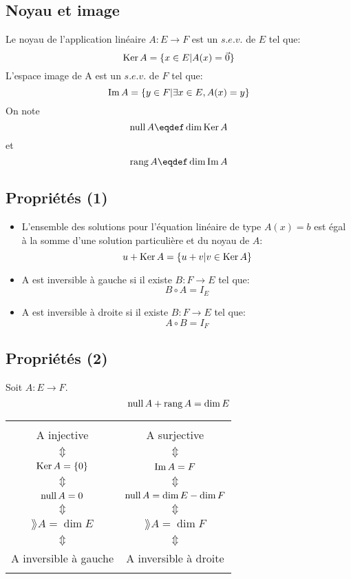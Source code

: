 \subsection{Noyau et image}
Le noyau de l'application linéaire
$A: E \rightarrow F$ est un $s.e.v.$ de $E$ tel que:
\[ \operatorname{Ker} A = \{x \in E| A(x) = \vec{0}\} \]
L'espace image de A est un $s.e.v.$ de $F$ tel que:
\[ \operatorname{Im} A = \{y \in F | \exists x \in E, A(x) = y\} \]
On note
\[ \newnull A \eqdef \dim \newker A \]
et
\[ \rang A \eqdef \dim \newim A \]

\subsection{Propriétés (1)}
\begin{itemize}
  \item L'ensemble des solutions pour l'équation linéaire de type $A(x) = b$
    est égal à la somme d'une solution particulière et du noyau de $A$:
    \[ u + \operatorname{Ker} A = \{u + v | v \in \operatorname{Ker} A\} \]
  \item A est inversible à gauche si il existe $B : F \rightarrow E$ tel que:
    \[ B\circ A = I_E \]
  \item A est inversible à droite si il existe $B : F \rightarrow E$ tel que:
    \[ A\circ B = I_F \]
\end{itemize}

\subsection{Propriétés (2)}
Soit $A : E \rightarrow F$.
\[ \operatorname{null} A + \operatorname{rang} A = \dim E \]
\begin{center}
  \begin{tabular}{|c c|}
    \hline
    &\\
    A injective & A surjective\\
    $\Updownarrow$ & $\Updownarrow$\\
    $\operatorname{Ker} A = \{0\}$ & $\operatorname{Im} A = F$\\
    $\Updownarrow$ & $\Updownarrow$\\
    $\operatorname{null} A = 0$ & $\operatorname{null} A = \dim E - \dim F$\\
    $\Updownarrow$ & $\Updownarrow$\\
    $\rang A = \dim E$ & $\rang A = \dim F$\\
    $\Updownarrow$ & $\Updownarrow$\\
    A inversible à gauche&A inversible à droite\\
    &\\
    \hline
  \end{tabular}
\end{center}


